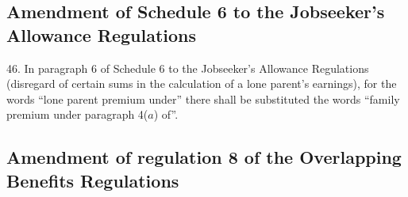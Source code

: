 \documentclass[a4paper]{article}
\begin{document}
\subsection[46. Amendment of Schedule 6 to the Jobseeker’s Allowance Regulations]{Amendment of Schedule 6 to the Jobseeker’s Allowance Regulations}

46.  In paragraph 6 of Schedule 6 to the Jobseeker’s Allowance Regulations (disregard of certain sums in the calculation of a lone parent’s earnings), for the words “lone parent premium under” there shall be substituted the words “family premium under paragraph 4($a$) of”.

\subsection[47. Amendment of regulation 8 of the Overlapping Benefits Regulations]{Amendment of regulation 8 of the Overlapping Benefits Regulations}
\end{document}
